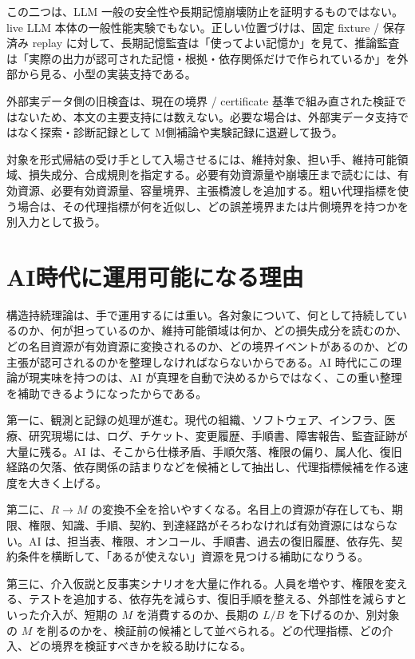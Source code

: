 \documentclass[12pt,a4paper]{article}
\begin{document}
この二つは、LLM 一般の安全性や長期記憶崩壊防止を証明するものではない。live LLM 本体の一般性能実験でもない。正しい位置づけは、固定 fixture / 保存済み replay に対して、長期記憶監査は「使ってよい記憶か」を見て、推論監査は「実際の出力が認可された記憶・根拠・依存関係だけで作られているか」を外部から見る、小型の実装支持である。

外部実データ側の旧検査は、現在の境界 / certificate 基準で組み直された検証ではないため、本文の主要支持には数えない。必要な場合は、外部実データ支持ではなく探索・診断記録として M側補論や実験記録に退避して扱う。

対象を形式帰結の受け手として入場させるには、維持対象、担い手、維持可能領域、損失成分、合成規則を指定する。必要有効資源量や崩壊圧まで読むには、有効資源、必要有効資源量、容量境界、主張橋渡しを追加する。粗い代理指標を使う場合は、その代理指標が何を近似し、どの誤差境界または片側境界を持つかを別入力として扱う。

\section{AI時代に運用可能になる理由}\label{aiux6642ux4ee3ux306bux904bux7528ux53efux80fdux306bux306aux308bux7406ux7531}

構造持続理論は、手で運用するには重い。各対象について、何として持続しているのか、何が担っているのか、維持可能領域は何か、どの損失成分を読むのか、どの名目資源が有効資源に変換されるのか、どの境界イベントがあるのか、どの主張が認可されるのかを整理しなければならないからである。AI 時代にこの理論が現実味を持つのは、AI が真理を自動で決めるからではなく、この重い整理を補助できるようになったからである。

第一に、観測と記録の処理が進む。現代の組織、ソフトウェア、インフラ、医療、研究現場には、ログ、チケット、変更履歴、手順書、障害報告、監査証跡が大量に残る。AI は、そこから仕様矛盾、手順欠落、権限の偏り、属人化、復旧経路の欠落、依存関係の詰まりなどを候補として抽出し、代理指標候補を作る速度を大きく上げる。

第二に、\(R\to M\) の変換不全を拾いやすくなる。名目上の資源が存在しても、期限、権限、知識、手順、契約、到達経路がそろわなければ有効資源にはならない。AI は、担当表、権限、オンコール、手順書、過去の復旧履歴、依存先、契約条件を横断して、「あるが使えない」資源を見つける補助になりうる。

第三に、介入仮説と反事実シナリオを大量に作れる。人員を増やす、権限を変える、テストを追加する、依存先を減らす、復旧手順を整える、外部性を減らすといった介入が、短期の \(M\) を消費するのか、長期の \(L/B\) を下げるのか、別対象の \(M\) を削るのかを、検証前の候補として並べられる。どの代理指標、どの介入、どの境界を検証すべきかを絞る助けになる。
\end{document}
